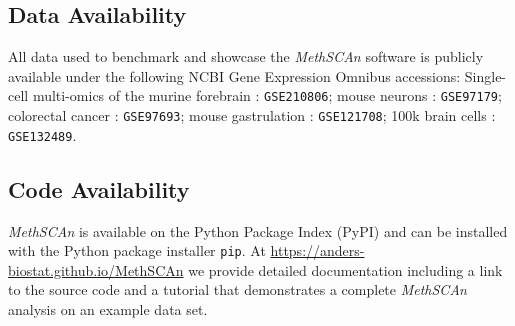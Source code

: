 \documentclass[10pt]{article}
\begin{document}
\subsection*{Data Availability}

All data used to benchmark and showcase the \textit{MethSCAn} software is publicly available under the following NCBI Gene Expression Omnibus accessions:
Single-cell multi-omics of the murine forebrain \citep{kremer_scnmt}: \texttt{GSE210806};
mouse neurons \citep{luo2017single}: \texttt{GSE97179};
colorectal cancer \citep{bian2018single}: \texttt{GSE97693};
mouse gastrulation \citep{argelaguet2019gastru}: \texttt{GSE121708};
100k brain cells \citep{liu2021dna}: \texttt{GSE132489}.


\subsection*{Code Availability}

\textit{MethSCAn} is available on the Python Package Index (PyPI) and can be installed with the Python package installer \texttt{pip}.
At \url{https://anders-biostat.github.io/MethSCAn} we provide detailed documentation including a link to the source code and a tutorial that demonstrates a complete \textit{MethSCAn} analysis on an example data set.
\end{document}
